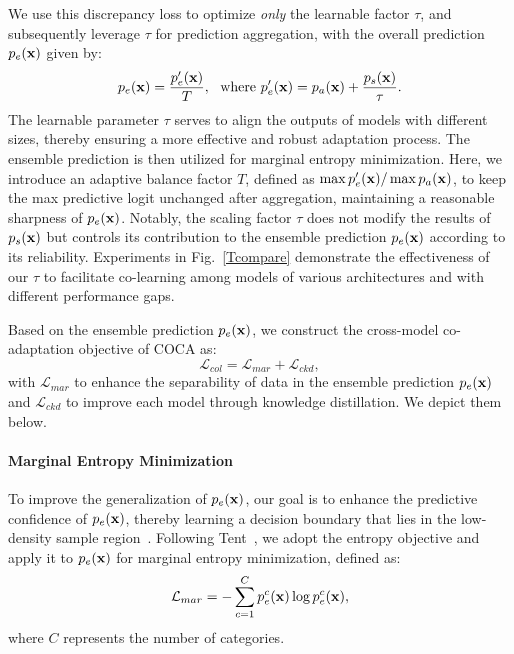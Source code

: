 We use this discrepancy loss to optimize \textit{only} the learnable factor $\tau$, and subsequently leverage $\tau$ for prediction aggregation, with the overall prediction $p_{e}(\mathbf{x})$ given by:
\begin{equation}
    p_{e}(\mathbf{x}) = \frac{p_{e}'(\mathbf{x})}{T},~~\text{where}~p_{e}'(\mathbf{x})=p_{a}(\mathbf{x}) + \frac{p_{s}(\mathbf{x})}{\tau}.
    \label{tau_ensemble}
\end{equation}
The learnable parameter $\tau$ serves to align the outputs of models with different sizes, thereby ensuring a more effective and robust adaptation process. The ensemble prediction is then utilized for marginal entropy minimization. Here, we introduce an adaptive balance factor $T$, defined as $\max p_{e}'(\mathbf{x}) / \max p_{a}(\mathbf{x})$, to keep the max predictive logit unchanged after aggregation, maintaining a reasonable sharpness of $p_{e}(\mathbf{x})$.
Notably, the scaling factor $\tau$ does not modify the results of $p_{s}(\mathbf{x})$ but controls its contribution to the ensemble prediction $p_e(\mathbf{x})$ according to its reliability. \linebreak Experiments in Fig.~\ref{Tcompare} demonstrate the effectiveness of our $\tau$ to facilitate co-learning among models of various architectures and with different performance gaps.

Based on the ensemble prediction $p_{e}(\mathbf{x})$, we construct the cross-model co-adaptation objective of COCA as:
\begin{equation}
\label{colloss}
    \mathcal{L}_{col} = \mathcal{L}_{mar} + \mathcal{L}_{ckd},
\end{equation}
with $\mathcal{L}_{mar}$ to enhance the separability of data in the ensemble prediction $p_e(\mathbf{x})$  and $\mathcal{L}_{ckd}$ to improve each model through knowledge distillation. We depict them below.

\vspace{-5pt}\paragraph{Marginal Entropy Minimization} To improve the generalization of $p_e(\mathbf{x})$, our goal is to enhance the predictive confidence of $p_e(\mathbf{x})$, thereby learning a decision boundary that lies in the low-density sample region~\cite{grandvalet2004semi}. Following Tent~\cite{wang2020tent}, we adopt the entropy objective and apply it to $p_e(\mathbf{x})$ for marginal entropy minimization, defined as:
\begin{equation}
    \mathcal{L}_{mar} = - \sum_{c=1}^C p_{e}^c(\mathbf{x})\log p_{e}^c(\mathbf{x}),
    \label{marginalent}
\end{equation}
where $C$ represents the number of categories.


